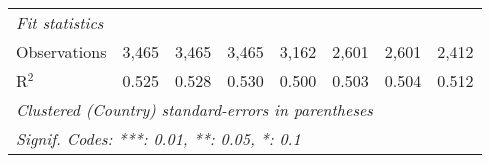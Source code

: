 \begin{tabular}{lccccccc}
   \midrule \emph{Fit statistics}\\
   Observations                                                   & 3,465          & 3,465          & 3,465          & 3,162         & 2,601         & 2,601         & 2,412\\  
   R$^2$                                                          & 0.525          & 0.528          & 0.530          & 0.500         & 0.503         & 0.504         & 0.512\\  
   \midrule
   \multicolumn{8}{l}{\emph{Clustered (Country) standard-errors in parentheses}}\\
   \multicolumn{8}{l}{\emph{Signif. Codes: ***: 0.01, **: 0.05, *: 0.1}}\\
\end{tabular}
\par\endgroup


